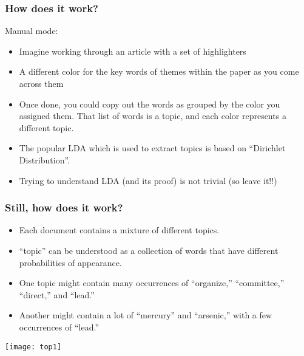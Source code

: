 \begin{frame}[fragile]\frametitle{How does it work?}
Manual mode:
  \begin{itemize}
  	\item Imagine working through an article with a set of highlighters
	\item A different color for the key words of themes within the paper as you come across them
	\item Once done, you could copy out the words as grouped by the color you assigned them. That list of words is a topic, and each color represents a different topic.
	\item The popular LDA which is used to extract topics is based on ``Dirichlet Distribution''.
	\item Trying to understand LDA (and its proof) is not trivial (so leave it!!)
  \end{itemize}
\end{frame}

\begin{frame}[fragile]\frametitle{Still, how does it work?}
  \begin{itemize}
  	\item Each document contains a mixture of different topics.
	\item  ``topic'' can be understood as a collection of words that have different probabilities of appearance. 
	\item One topic might contain many occurrences of ``organize,'' ``committee,'' ``direct,'' and ``lead.'' 
	\item Another might contain a lot of ``mercury'' and ``arsenic,'' with a few occurrences of ``lead.'' 
  \end{itemize}
\begin{center}
\texttt{[image: top1]}
\end{center}
\end{frame}

